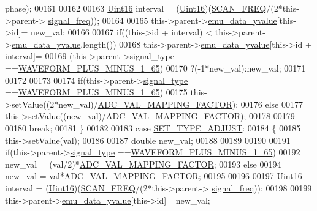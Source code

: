 \begin{DoxyCode}
      phase);
00161 
00162 
00163         \hyperlink{a00004_aae7407b021d43f7193a81a58cfb3e297}{Uint16} interval = (\hyperlink{a00004_aae7407b021d43f7193a81a58cfb3e297}{Uint16})(\hyperlink{a00086_a8127170b687c1f67a968886c128e76e4}{SCAN\_FREQ}/(2*this->parent->
      \hyperlink{a00008_a67039999d520fc483fab521fae5ddde4}{signal\_freq}));
00164 
00165         this->parent->\hyperlink{a00008_ad922d05d1e988d84f404c115fe909f72}{emu\_data\_yvalue}[this->id]= new\_val;
00166 
00167         \textcolor{keywordflow}{if}((this->\textcolor{keywordtype}{id} + interval) < this->parent->\hyperlink{a00008_ad922d05d1e988d84f404c115fe909f72}{emu\_data\_yvalue}.length())
00168         this->parent->\hyperlink{a00008_ad922d05d1e988d84f404c115fe909f72}{emu\_data\_yvalue}[this->id + interval]=
00169         (this->parent->signal\_type ==\hyperlink{a00090_a0923d3b365a36e1e8c401cec964aa36f}{WAVEFORM\_PLUS\_MINUS\_1\_65})
00170         ?(-1*new\_val):new\_val;
00171 
00172 
00173 
00174         \textcolor{keywordflow}{if}(this->parent->\hyperlink{a00008_a070edaec5aee6ba1f5a6866bc32c8ce4}{signal\_type} ==\hyperlink{a00090_a0923d3b365a36e1e8c401cec964aa36f}{WAVEFORM\_PLUS\_MINUS\_1\_65})
00175         this->setValue((2*new\_val)/\hyperlink{a00086_ada92d3eeeec0cbeee41e76a52d145792}{ADC\_VAL\_MAPPING\_FACTOR});
00176         \textcolor{keywordflow}{else}
00177         this->setValue((new\_val)/\hyperlink{a00086_ada92d3eeeec0cbeee41e76a52d145792}{ADC\_VAL\_MAPPING\_FACTOR});
00178 
00179 
00180     \textcolor{keywordflow}{break};
00181     \}
00182 
00183     \textcolor{keywordflow}{case} \hyperlink{a00090_a16b6b7b5ad68ec0dd62a3c9e97f88adb}{SET\_TYPE\_ADJUST}:
00184     \{
00185         this->setValue(val);
00186 
00187         \textcolor{keywordtype}{double} new\_val;
00188 
00189 
00190 
00191         \textcolor{keywordflow}{if}(this->parent->\hyperlink{a00008_a070edaec5aee6ba1f5a6866bc32c8ce4}{signal\_type} ==\hyperlink{a00090_a0923d3b365a36e1e8c401cec964aa36f}{WAVEFORM\_PLUS\_MINUS\_1\_65})
00192         new\_val = (val/2)*\hyperlink{a00086_ada92d3eeeec0cbeee41e76a52d145792}{ADC\_VAL\_MAPPING\_FACTOR};
00193         \textcolor{keywordflow}{else}
00194         new\_val = val*\hyperlink{a00086_ada92d3eeeec0cbeee41e76a52d145792}{ADC\_VAL\_MAPPING\_FACTOR};
00195 
00196 
00197         \hyperlink{a00004_aae7407b021d43f7193a81a58cfb3e297}{Uint16} interval = (\hyperlink{a00004_aae7407b021d43f7193a81a58cfb3e297}{Uint16})(\hyperlink{a00086_a8127170b687c1f67a968886c128e76e4}{SCAN\_FREQ}/(2*this->parent->
      \hyperlink{a00008_a67039999d520fc483fab521fae5ddde4}{signal\_freq}));
00198 
00199         this->parent->\hyperlink{a00008_ad922d05d1e988d84f404c115fe909f72}{emu\_data\_yvalue}[this->id]= new\_val;

\end{DoxyCode}
